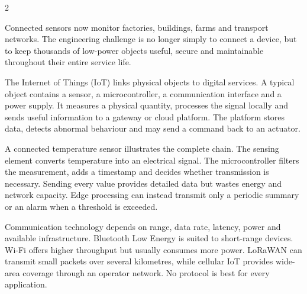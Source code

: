 

\begin{multicols}{2}
\begin{engineeringnews}
Connected sensors now monitor factories, buildings, farms and transport networks. The engineering
challenge is no longer simply to connect a device, but to keep thousands of low-power objects useful,
secure and maintainable throughout their entire service life.
\end{engineeringnews}

\begin{ecarticle}
The Internet of Things (IoT) links physical objects to digital services. A typical object contains a
sensor, a microcontroller, a communication interface and a power supply. It measures a physical
quantity, processes the signal locally and sends useful information to a gateway or cloud platform.
The platform stores data, detects abnormal behaviour and may send a command back to an actuator.

A connected temperature sensor illustrates the complete chain. The sensing element converts
temperature into an electrical signal. The microcontroller filters the measurement, adds a timestamp
and decides whether transmission is necessary. Sending every value provides detailed data but wastes
energy and network capacity. Edge processing can instead transmit only a periodic summary or an alarm
when a threshold is exceeded.

Communication technology depends on range, data rate, latency, power and available infrastructure.
Bluetooth Low Energy is suited to short-range devices. Wi-Fi offers higher throughput but usually
consumes more power. LoRaWAN can transmit small packets over several kilometres, while cellular IoT
provides wide-area coverage through an operator network. No protocol is best for every application.


\end{ecarticle}
\end{multicols}
